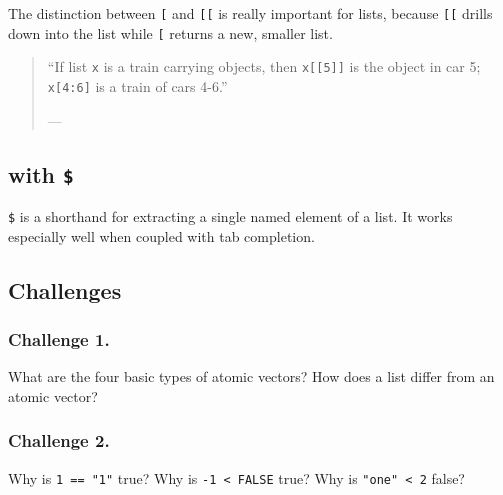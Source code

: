 \documentclass[
]{book}
\newenvironment{Shaded}{\begin{snugshade}}{\end{snugshade}}
\newcommand{\CommentTok}[1]{\textcolor[rgb]{0.56,0.35,0.01}{\textit{#1}}}
\newcommand{\NormalTok}[1]{#1}
\newcommand{\OperatorTok}[1]{\textcolor[rgb]{0.81,0.36,0.00}{\textbf{#1}}}
\begin{document}
The distinction between \texttt{{[}} and \texttt{{[}{[}} is really important for lists, because \texttt{{[}{[}} drills down into the list while \texttt{{[}} returns a new, smaller list.

\begin{quote}
``If list \texttt{x} is a train carrying objects, then \texttt{x{[}{[}5{]}{]}} is
the object in car 5; \texttt{x{[}4:6{]}} is a train of cars 4-6.''

--- \citet{RLangTip}
\end{quote}

\hypertarget{with-2}{%
\subsection{\texorpdfstring{with \texttt{\$}}{with \$}}\label{with-2}}

\texttt{\$} is a shorthand for extracting a single named element of a list. It works especially well when coupled with tab completion.

\begin{Shaded}
\end{Shaded}

\hypertarget{challenges-12}{%
\subsection{Challenges}\label{challenges-12}}

\hypertarget{challenge-1.-9}{%
\subsubsection*{Challenge 1.}\label{challenge-1.-9}}

What are the four basic types of atomic vectors? How does a list differ from an atomic vector?

\hypertarget{challenge-2.-8}{%
\subsubsection*{Challenge 2.}\label{challenge-2.-8}}

Why is \texttt{1\ ==\ "1"} true? Why is \texttt{-1\ \textless{}\ FALSE} true? Why is \texttt{"one"\ \textless{}\ 2} false?
\end{document}
